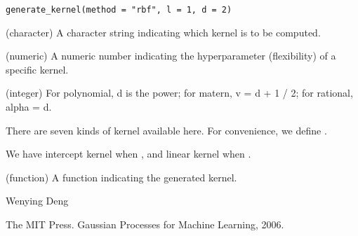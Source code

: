 \documentclass[a4paper]{book}
\begin{document}
%
\begin{Usage}
\begin{verbatim}
generate_kernel(method = "rbf", l = 1, d = 2)
\end{verbatim}
\end{Usage}
%
\begin{Arguments}
\begin{ldescription}
\item[\code{method}] (character) A character string indicating which kernel 
is to be computed.

\item[\code{l}] (numeric) A numeric number indicating the hyperparameter 
(flexibility) of a specific kernel.

\item[\code{d}] (integer) For polynomial, d is the power; for matern, v = d + 1 / 2; for
rational, alpha = d.
\end{ldescription}
\end{Arguments}
%
\begin{Details}\relax
There are seven kinds of kernel available here. For convenience, we define
.

 


 

  We have intercept
kernel when , and linear kernel when .

 
\end{Details}
%
\begin{Value}
\begin{ldescription}
\item[\code{kern}] (function) A function indicating the generated kernel.
\end{ldescription}
\end{Value}
%
\begin{Author}\relax
Wenying Deng
\end{Author}
%
\begin{References}\relax
The MIT Press. Gaussian Processes for Machine Learning, 2006.
\end{References}
\end{document}
